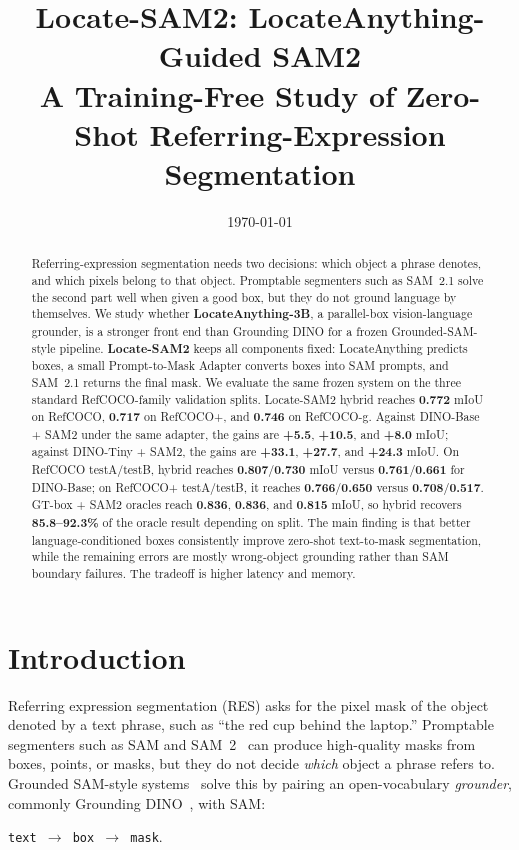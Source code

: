 \documentclass[11pt,a4paper]{article}
\title{\textbf{Locate-SAM2: LocateAnything-Guided SAM2}\\[0.2em]
  \large A Training-Free Study of Zero-Shot Referring-Expression Segmentation}
\date{\today}
\begin{document}
\maketitle

\begin{abstract}
\noindent
Referring-expression segmentation needs two decisions: which object a phrase denotes, and which pixels belong to that object.
Promptable segmenters such as SAM~2.1 solve the second part well when given a good box, but they do not ground language by themselves.
We study whether \textbf{LocateAnything-3B}, a parallel-box vision-language grounder, is a stronger front end than Grounding DINO for a frozen Grounded-SAM-style pipeline.
\textbf{Locate-SAM2} keeps all components fixed: LocateAnything predicts boxes, a small Prompt-to-Mask Adapter converts boxes into SAM prompts, and SAM~2.1 returns the final mask.
We evaluate the same frozen system on the three standard RefCOCO-family validation splits.
Locate-SAM2 hybrid reaches \textbf{0.772} mIoU on RefCOCO, \textbf{0.717} on RefCOCO+, and \textbf{0.746} on RefCOCO-g.
Against DINO-Base + SAM2 under the same adapter, the gains are \textbf{+5.5}, \textbf{+10.5}, and \textbf{+8.0} mIoU; against DINO-Tiny + SAM2, the gains are \textbf{+33.1}, \textbf{+27.7}, and \textbf{+24.3} mIoU.
On RefCOCO testA/testB, hybrid reaches \textbf{0.807}/\textbf{0.730} mIoU versus \textbf{0.761}/\textbf{0.661} for DINO-Base; on RefCOCO+ testA/testB, it reaches \textbf{0.766}/\textbf{0.650} versus \textbf{0.708}/\textbf{0.517}.
GT-box + SAM2 oracles reach \textbf{0.836}, \textbf{0.836}, and \textbf{0.815} mIoU, so hybrid recovers \textbf{85.8--92.3\%} of the oracle result depending on split.
The main finding is that better language-conditioned boxes consistently improve zero-shot text-to-mask segmentation, while the remaining errors are mostly wrong-object grounding rather than SAM boundary failures.
The tradeoff is higher latency and memory.
\end{abstract}
\vspace{0.75em}

\section{Introduction}
\label{sec:intro}

Referring expression segmentation (RES) asks for the pixel mask of the object denoted by a text phrase, such as ``the red cup behind the laptop.''
Promptable segmenters such as SAM and SAM~2~\cite{kirillov2023sam,ravi2024sam2} can produce high-quality masks from boxes, points, or masks, but they do not decide \emph{which} object a phrase refers to.
Grounded SAM-style systems~\cite{ren2024groundedsam} solve this by pairing an open-vocabulary \emph{grounder}, commonly Grounding DINO~\cite{liu2023groundingdino}, with SAM:
\begin{center}
\small \texttt{text $\rightarrow$ box $\rightarrow$ mask}.
\end{center}
\end{document}
